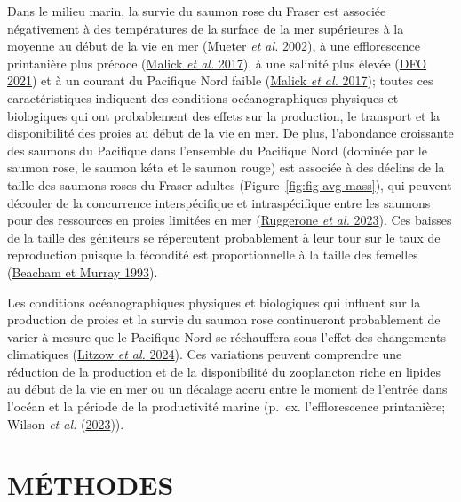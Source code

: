 \documentclass[french,11pt]{book}
\begin{document}
Dans le milieu marin, la survie du saumon rose du Fraser est associée négativement à des températures de la surface de la mer supérieures à la moyenne au début de la vie en mer (\protect\hyperlink{ref-mueterOppositeEffectsOcean2002}{Mueter \emph{et al.} 2002}), à une efflorescence printanière plus précoce (\protect\hyperlink{ref-malickEffectsNorthPacific2017}{Malick \emph{et al.} 2017}), à une salinité plus élevée (\protect\hyperlink{ref-dfoPreseasonRunSize2021}{DFO 2021}) et à un courant du Pacifique Nord faible (\protect\hyperlink{ref-malickEffectsNorthPacific2017}{Malick \emph{et al.} 2017}); toutes ces caractéristiques indiquent des conditions océanographiques physiques et biologiques qui ont probablement des effets sur la production, le transport et la disponibilité des proies au début de la vie en mer. De plus, l'abondance croissante des saumons du Pacifique dans l'ensemble du Pacifique Nord (dominée par le saumon rose, le saumon kéta et le saumon rouge) est associée à des déclins de la taille des saumons roses du Fraser adultes (Figure~\ref{fig:fig-avg-mass}), qui peuvent découler de la concurrence interspécifique et intraspécifique entre les saumons pour des ressources en proies limitées en mer (\protect\hyperlink{ref-ruggeroneDiatomsKillerWhales2023}{Ruggerone \emph{et al.} 2023}). Ces baisses de la taille des géniteurs se répercutent probablement à leur tour sur le taux de reproduction puisque la fécondité est proportionnelle à la taille des femelles (\protect\hyperlink{ref-beachamFecundityEggSize1993}{Beacham et Murray 1993}).

Les conditions océanographiques physiques et biologiques qui influent sur la production de proies et la survie du saumon rose continueront probablement de varier à mesure que le Pacifique Nord se réchauffera sous l'effet des changements climatiques (\protect\hyperlink{ref-litzowClimateAttributionTime2024}{Litzow \emph{et al.} 2024}). Ces variations peuvent comprendre une réduction de la production et de la disponibilité du zooplancton riche en lipides au début de la vie en mer ou un décalage accru entre le moment de l'entrée dans l'océan et la période de la productivité marine (p.~ex. l'efflorescence printanière; Wilson \emph{et al.} (\protect\hyperlink{ref-wilsonPhenologicalShiftsMismatch2023}{2023})).

\hypertarget{muxe9thodes}{%
\section{MÉTHODES}\label{muxe9thodes}}
\end{document}

